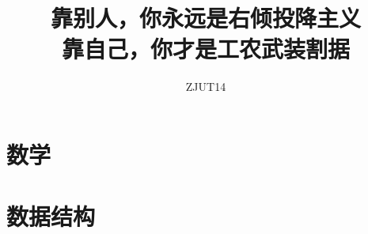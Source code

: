 \documentclass{article}
\title{靠别人，你永远是右倾投降主义\\靠自己，你才是工农武装割据}
\author{ZJUT14}
\begin{document}
\begin{titlepage}
\maketitle
\thispagestyle{empty}
\pagebreak
\pagestyle{plain}
\tableofcontents
\end{titlepage}



\section{﻿数学}
\section{数据结构}
\section{
}
\end{document}
